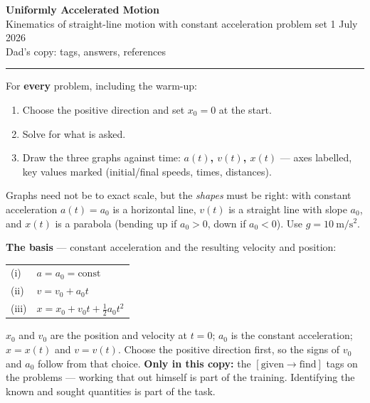 \documentclass[11pt,a4paper]{article}
\newcommand{\copyname}{Dad's copy: tags, answers, references}
\newcommand{\copyname}{student's copy}
\newcommand{\mss}{\ \mathrm{m/s^2}}
\begin{document}
\color{ink}

{\huge\bfseries Uniformly Accelerated Motion}\\[4pt]
{\color{muted} Kinematics of straight-line motion with constant acceleration
\;\textperiodcentered\; problem set 1 \;\textperiodcentered{} July 2026}\\[2pt]
{\color{muted}\copyname}\\[6pt]
{\color{rule}\rule{\linewidth}{0.9pt}}

\begin{tcolorbox}[colback=boxbg, colframe=accent, boxrule=0.9pt, arc=2.5mm,
                  left=10pt, right=10pt, top=7pt, bottom=7pt,
                  title={\large\bfseries The rules of the game}, coltitle=white]
For \textbf{every} problem, including the warm-up:
\begin{enumerate}[label=\textcolor{accent}{\textbf{\arabic*.}}, leftmargin=1.8em, itemsep=1.5pt, topsep=3pt]
  \item Choose the positive direction and set $x_0 = 0$ at the start.
  \item Solve for what is asked.
  \item Draw the three graphs against time: \textbf{$a(t)$, $v(t)$, $x(t)$} --- axes labelled,
        key values marked (initial/final speeds, times, distances).
\end{enumerate}
Graphs need not be to exact scale, but the \emph{shapes} must be right: with constant
acceleration $a(t)=a_0$ is a horizontal line, $v(t)$ is a straight line with slope $a_0$,
and $x(t)$ is a parabola (bending up if $a_0>0$, down if $a_0<0$). Use $g = 10\mss$.
\smallskip

\textbf{The basis} --- constant acceleration and the resulting velocity and position:
\begin{center}
\renewcommand{\arraystretch}{1.5}
\begin{tabular}{@{}ll@{}}
\toprule
(i)   & $a = a_0 = \mathrm{const}$\\
(ii)  & $v = v_0 + a_0t$\\
(iii) & $x = x_0 + v_0t + \tfrac{1}{2}a_0t^{2}$\\
\bottomrule
\end{tabular}
\end{center}
{\small\color{muted} $x_0$ and $v_0$ are the position and velocity at $t=0$; $a_0$ is the
constant acceleration; $x=x(t)$ and $v=v(t)$. Choose the positive direction first, so
the signs of $v_0$ and $a_0$ follow from that choice.
\ifdefined\isdad
\textbf{Only in this copy:} the $[\text{given} \to \text{find}]$ tags on the problems ---
working that out himself is part of the training.
\else
Identifying the known and sought quantities is part of the task.
\fi
}
\end{tcolorbox}
\end{document}
